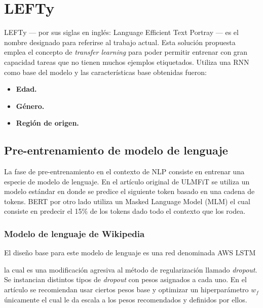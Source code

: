 
\chapter{LEFTy}

\label{Chapter5} %

LEFTy --- por sus siglas en inglés: Language Efficient Text Portray --- es el nombre designado para referirse al trabajo actual. Esta solución propuesta emplea el concepto de \textit{transfer learning} para poder permitir entrenar con gran capacidad tareas que no tienen muchos ejemplos etiquetados. Utiliza una RNN como base del modelo y las características base obtenidas fueron:

\begin{itemize}
\item \textbf{Edad.}
\item \textbf{Género.}
\item \textbf{Región de origen.}
\end{itemize}

\section{Pre-entrenamiento de modelo de lenguaje}

La fase de pre-entrenamiento en el contexto de NLP consiste en entrenar una especie de modelo de lenguaje. En el artículo original de ULMFiT se utiliza un modelo estándar en donde se predice el siguiente token basado en una cadena de tokens. BERT por otro lado utiliza un Masked Language Model (MLM) el cual consiste en predecir el 15\% de los tokens dado todo el contexto que los rodea.
\begin{comment}
agregar ulmfit howard & sr. agregar bert jacob et al. etc.
\end{comment}

\subsection{Modelo de lenguaje de Wikipedia}

El diseño base para este modelo de lenguaje es una red denominada AWS LSTM
\begin{comment}
merity et al 2017
\end{comment}
la cual es una modificación agresiva al método de regularización llamado \textit{dropout}. Se instancian distintos tipos de \textit{dropout} con pesos asignados a cada uno. En el artículo se recomiendan usar ciertos pesos base y optimizar un hiperparámetro $w_f$ únicamente el cual le da escala a los pesos recomendados y definidos por ellos.

